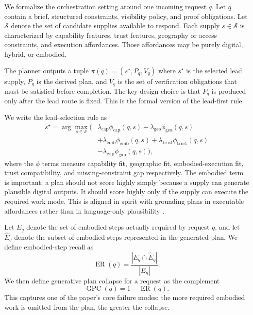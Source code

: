 We formalize the orchestration setting around one incoming request $q$. Let $q$ contain a brief, structured constraints, visibility policy, and proof obligations. Let $\mathcal{S}$ denote the set of candidate supplies available to respond. Each supply $s \in \mathcal{S}$ is characterized by capability features, trust features, geography or access constraints, and execution affordances. Those affordances may be purely digital, hybrid, or embodied.

The planner outputs a tuple $\pi(q) = (s^\star, P_q, V_q)$ where $s^\star$ is the selected lead supply, $P_q$ is the derived plan, and $V_q$ is the set of verification obligations that must be satisfied before completion. The key design choice is that $P_q$ is produced only after the lead route is fixed. This is the formal version of the lead-first rule.

We write the lead-selection rule as
\begin{equation}
\begin{aligned}
s^\star = \arg\max_{s \in \mathcal{S}} \Big(
&\lambda_{\text{cap}}\phi_{\text{cap}}(q,s)+
\lambda_{\text{geo}}\phi_{\text{geo}}(q,s) \\
&+\lambda_{\text{emb}}\phi_{\text{emb}}(q,s)+
\lambda_{\text{trust}}\phi_{\text{trust}}(q,s) \\
&-\lambda_{\text{gap}}\phi_{\text{gap}}(q,s)
\Big),
\end{aligned}
\end{equation}
where the $\phi$ terms measure capability fit, geographic fit, embodied-execution fit, trust compatibility, and missing-constraint gap respectively. The embodied term is important: a plan should not score highly simply because a supply can generate plausible digital outputs. It should score highly only if the supply can execute the required work mode. This is aligned in spirit with grounding plans in executable affordances rather than in language-only plausibility \cite{ahn2022saycan}.

Let $E_q$ denote the set of embodied steps actually required by request $q$, and let $\hat{E}_q$ denote the subset of embodied steps represented in the generated plan. We define embodied-step recall as
\begin{equation}
\operatorname{ER}(q)=\frac{|E_q \cap \hat{E}_q|}{|E_q|}.
\end{equation}
We then define generative plan collapse for a request as the complement
\begin{equation}
\operatorname{GPC}(q)=1-\operatorname{ER}(q).
\end{equation}
This captures one of the paper's core failure modes: the more required embodied work is omitted from the plan, the greater the collapse.

